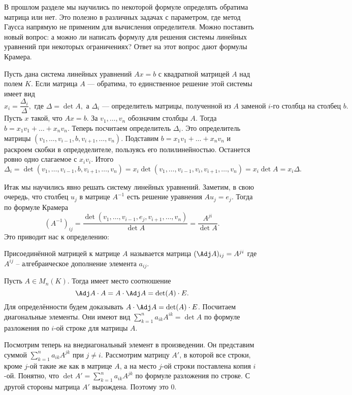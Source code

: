 В прошлом разделе мы научились по некоторой формуле определять обратима матрица или нет. Это полезно в различных задачах с параметром, где метод Гаусса напрямую не применим для вычисления определителя. Можно поставить новый вопрос: а можно ли написать формулу для решения системы линейных уравнений при некоторых ограничениях? Ответ на  этот вопрос дают формулы Крамера.

Пусть дана система линейных уравнений $Ax=b$ с квадратной матрицей $A$ над полем $K$. Если матрица $A$ --- обратима, то единственное решение этой системы имеет вид $$x_i=\frac{\Delta_i}{\Delta}, \text{ где } \Delta=\det A, \text{ а } \Delta_i \text{ --- определитель матрицы, полученной из  $A$ заменой $i$-го столбца на столбец $b$}.$$
\proof Пусть $x$ такой, что $Ax=b$. За $v_1,\dots,v_n$ обозначим столбцы $A$. Тогда $b=x_1v_1+\dots+x_nv_n$.  Теперь посчитаем определитель $\Delta_i$. Это определитель матрицы $(v_1,\dots,v_{i-1},b,v_{i+1},\dots,v_n)$. Подставим $b=x_1v_1+\dots+x_nv_n$ и раскроем скобки в опредеделителе, пользуясь его полилинейностью. Останется ровно одно слагаемое с $x_iv_i$. Итого
$$\Delta_i=\det (v_1,\dots,v_{i-1},b,v_{i+1},\dots,v_n)= x_i \det(v_1,\dots,v_{i-1},v_i,v_{i+1},\dots,v_n)=x_i\det A=x_i \Delta.$$
\endproof
\ethrm

Итак мы научились явно решать систему линейных уравнений. Заметим, в свою очередь, что столбец $u_j$ в матрице $A^{-1}$ есть решение уравнения $Au_j=e_j$. Тогда по формуле Крамера
$$(A^{-1})_{ij}=\frac{\det(v_1,\dots,v_{i-1}, e_j,v_{i+1},\dots,v_n)}{\det A}=\frac{A^{ji}}{\det A}.$$
Это приводит нас к определению:

\dfn
Присоединённой матрицей к матрице $A$ называется матрица $(\Adj A)_{ij}= A^{ji}$ где $A^{ij}$ -- алгебраическое дополнение элемента $a_{ij}$.
\edfn

\thrm
Пусть $A\in M_n(K)$. Тогда имеет место соотношение
$$\Adj A \cdot A= A\cdot \Adj A= \det(A)\cdot E.$$
 Для определённости будем доказывать $A\cdot \Adj A= \det(A)\cdot E$. Посчитаем диагональные элементы. Они имеют вид $\sum_{k=1}^n a_{ik} A^{ik}=\det A$ по формуле разложения по $i$-ой строке для матрицы $A$. 

Посмотрим теперь на внедиагональный элемент в произведении. Он представим суммой $\sum_{k=1}^n a_{ik}A^{jk}$ при $j\neq i$. Рассмотрим матрицу $A'$, в которой все строки, кроме $j$-ой такие же как в матрице $A$, а на место $j$-ой строки поставлена копия $i$-ой. Понятно, что $\det A'= \sum_{k=1}^n a_{ik}A^{jk}$ по формуле разложения по строке. С другой стороны матрица $A'$ вырождена. Поэтому это $0$.

